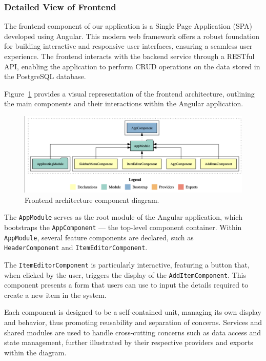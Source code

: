 \newpage

\subsubsection{Detailed View of Frontend}
The frontend component of our application is a Single Page Application (SPA) developed using Angular.
This modern web framework offers a robust foundation for building interactive and responsive user interfaces, ensuring a seamless user experience.
The frontend interacts with the backend service through a RESTful API, enabling the application to perform CRUD operations on the data stored in the PostgreSQL database.

Figure~\ref{fig:frontend_architecture} provides a visual representation of the frontend architecture, outlining the main components and their interactions within the Angular application.

\begin{figure}[H]
    \centering
    \includegraphics[width=\textwidth]{images/frontend/frontend_overview_component}
    \caption{Frontend architecture component diagram.}
    \label{fig:frontend_architecture}
\end{figure}

The \texttt{AppModule} serves as the root module of the Angular application, which bootstraps the \texttt{AppComponent} — the top-level component container.
Within \texttt{AppModule}, several feature components are declared, such as \\\texttt{HeaderComponent} and \texttt{ItemEditorComponent}.

The \texttt{ItemEditorComponent} is particularly interactive, featuring a button that, when clicked by the user, triggers the display of the \texttt{AddItemComponent}.
This component presents a form that users can use to input the details required to create a new item in the system.

Each component is designed to be a self-contained unit, managing its own display and behavior, thus promoting reusability and separation of concerns.
Services and shared modules are used to handle cross-cutting concerns such as data access and state management, further illustrated by their respective providers and exports within the diagram.

